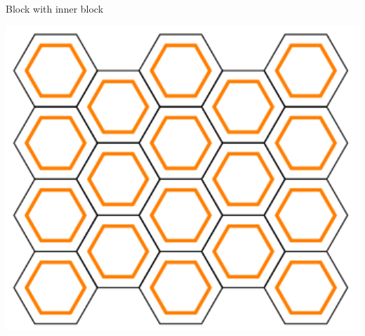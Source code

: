 \blocknode
{Block with inner block}
{
\begin{center}
    \includegraphics[width=6in]{diagrams/fbi3.png}
\end{center}
}
